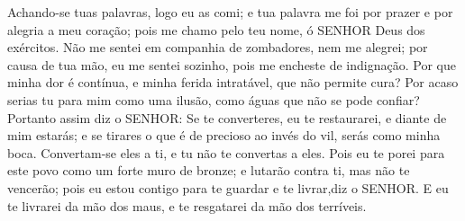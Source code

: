 {Achando-se tuas palavras, logo eu as comi; e tua palavra me foi por prazer e por alegria a meu coração; pois me chamo pelo teu nome, ó SENHOR Deus dos exércitos.
Não me sentei em companhia de zombadores, nem
{} me alegrei; por causa de tua mão, eu me sentei sozinho, pois me encheste de indignação.
Por que minha dor é contínua, e minha ferida intratável, que não permite cura? Por acaso serias tu para mim como uma ilusão, como águas que não se pode confiar?
Portanto assim diz o SENHOR: Se te converteres, eu te restaurarei, e diante de mim estarás; e se tirares o que é de precioso ao invés do vil, serás como minha boca. Convertam-se eles a ti, e tu não te convertas a eles.
Pois eu te porei para este povo
{} como um forte muro de bronze; e lutarão contra ti, mas não te vencerão; pois eu estou contigo para te guardar e te livrar,diz o SENHOR.
E eu te livrarei da mão dos maus, e te resgatarei da mão dos terríveis.

\par }

